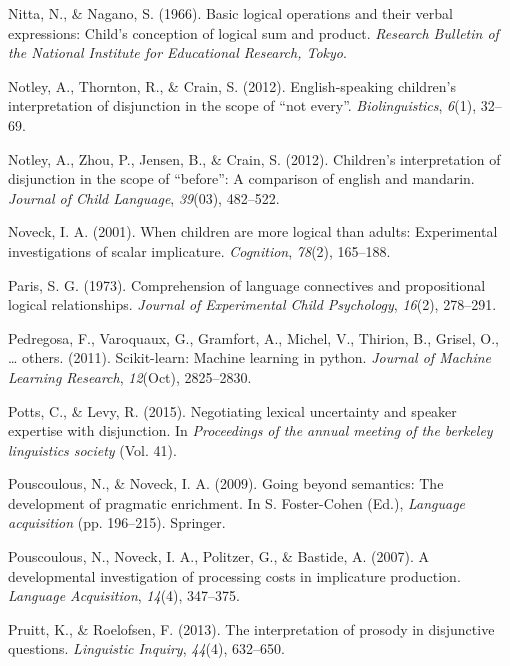\documentclass[oneside]{report}
\theoremstyle{definition}
\theoremstyle{definition}
\theoremstyle{definition}
\theoremstyle{remark}
\begin{document}
\hypertarget{ref-nitta1966basic}{}
Nitta, N., \& Nagano, S. (1966). Basic logical operations and their
verbal expressions: Child's conception of logical sum and product.
\emph{Research Bulletin of the National Institute for Educational
Research, Tokyo}.

\hypertarget{ref-notley2012notevery}{}
Notley, A., Thornton, R., \& Crain, S. (2012). English-speaking
children's interpretation of disjunction in the scope of ``not every''.
\emph{Biolinguistics}, \emph{6}(1), 32--69.

\hypertarget{ref-notley2012children}{}
Notley, A., Zhou, P., Jensen, B., \& Crain, S. (2012). Children's
interpretation of disjunction in the scope of ``before'': A comparison
of english and mandarin. \emph{Journal of Child Language},
\emph{39}(03), 482--522.

\hypertarget{ref-noveck2001children}{}
Noveck, I. A. (2001). When children are more logical than adults:
Experimental investigations of scalar implicature. \emph{Cognition},
\emph{78}(2), 165--188.

\hypertarget{ref-paris1973comprehension}{}
Paris, S. G. (1973). Comprehension of language connectives and
propositional logical relationships. \emph{Journal of Experimental Child
Psychology}, \emph{16}(2), 278--291.

\hypertarget{ref-pedregosa2011scikit}{}
Pedregosa, F., Varoquaux, G., Gramfort, A., Michel, V., Thirion, B.,
Grisel, O., \ldots{} others. (2011). Scikit-learn: Machine learning in
python. \emph{Journal of Machine Learning Research}, \emph{12}(Oct),
2825--2830.

\hypertarget{ref-potts2015negotiating}{}
Potts, C., \& Levy, R. (2015). Negotiating lexical uncertainty and
speaker expertise with disjunction. In \emph{Proceedings of the annual
meeting of the berkeley linguistics society} (Vol. 41).

\hypertarget{ref-pouscoulous2009going}{}
Pouscoulous, N., \& Noveck, I. A. (2009). Going beyond semantics: The
development of pragmatic enrichment. In S. Foster-Cohen (Ed.),
\emph{Language acquisition} (pp. 196--215). Springer.

\hypertarget{ref-pouscoulous2007developmental}{}
Pouscoulous, N., Noveck, I. A., Politzer, G., \& Bastide, A. (2007). A
developmental investigation of processing costs in implicature
production. \emph{Language Acquisition}, \emph{14}(4), 347--375.

\hypertarget{ref-pruitt2013interpretation}{}
Pruitt, K., \& Roelofsen, F. (2013). The interpretation of prosody in
disjunctive questions. \emph{Linguistic Inquiry}, \emph{44}(4),
632--650.
\end{document}
